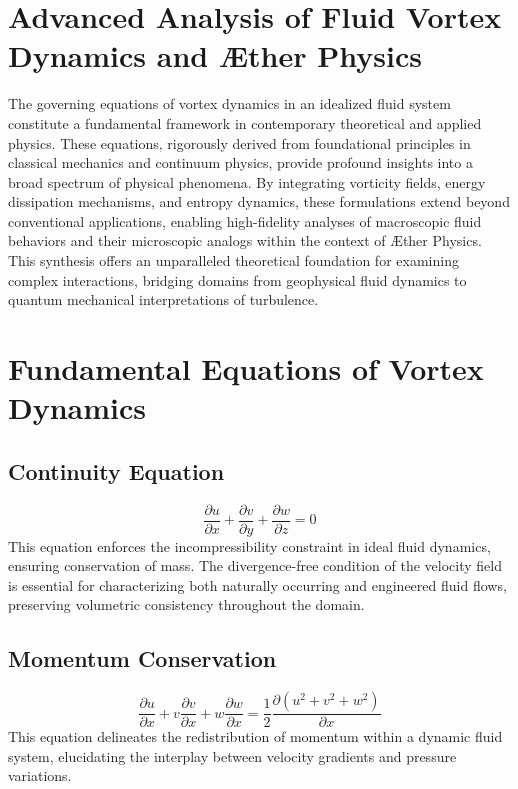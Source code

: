 

    \section{Advanced Analysis of Fluid Vortex Dynamics and Æther Physics}

    The governing equations of vortex dynamics in an idealized fluid system constitute a fundamental framework in contemporary theoretical and applied physics. These equations, rigorously derived from foundational principles in classical mechanics and continuum physics, provide profound insights into a broad spectrum of physical phenomena. By integrating vorticity fields, energy dissipation mechanisms, and entropy dynamics, these formulations extend beyond conventional applications, enabling high-fidelity analyses of macroscopic fluid behaviors and their microscopic analogs within the context of Æther Physics. This synthesis offers an unparalleled theoretical foundation for examining complex interactions, bridging domains from geophysical fluid dynamics to quantum mechanical interpretations of turbulence.

    \section{Fundamental Equations of Vortex Dynamics}

    \subsection{Continuity Equation}
    \begin{equation}
        \frac{\partial u}{\partial x} + \frac{\partial v}{\partial y} + \frac{\partial w}{\partial z} = 0
    \end{equation}
    This equation enforces the incompressibility constraint in ideal fluid dynamics, ensuring conservation of mass. The divergence-free condition of the velocity field is essential for characterizing both naturally occurring and engineered fluid flows, preserving volumetric consistency throughout the domain.

    \subsection{Momentum Conservation}
    \begin{equation}
        \frac{\partial u}{\partial x} + v \frac{\partial v}{\partial x} + w \frac{\partial w}{\partial x} = \frac{1}{2} \frac{\partial (u^2 + v^2 + w^2)}{\partial x}
    \end{equation}
    This equation delineates the redistribution of momentum within a dynamic fluid system, elucidating the interplay between velocity gradients and pressure variations.

